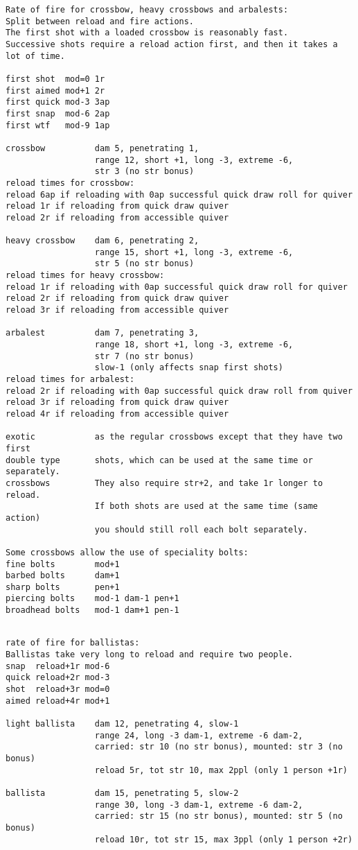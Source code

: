 \begin{verbatim}
\end{verbatim} \pagebreak[1] \begin{verbatim}
Rate of fire for crossbow, heavy crossbows and arbalests:
Split between reload and fire actions.
The first shot with a loaded crossbow is reasonably fast.
Successive shots require a reload action first, and then it takes a lot of time.

first shot  mod=0 1r
first aimed mod+1 2r
first quick mod-3 3ap
first snap  mod-6 2ap
first wtf   mod-9 1ap

crossbow          dam 5, penetrating 1,
                  range 12, short +1, long -3, extreme -6,
                  str 3 (no str bonus)
reload times for crossbow:
reload 6ap if reloading with 0ap successful quick draw roll for quiver
reload 1r if reloading from quick draw quiver
reload 2r if reloading from accessible quiver

heavy crossbow    dam 6, penetrating 2,
                  range 15, short +1, long -3, extreme -6,
                  str 5 (no str bonus)
reload times for heavy crossbow:
reload 1r if reloading with 0ap successful quick draw roll for quiver
reload 2r if reloading from quick draw quiver
reload 3r if reloading from accessible quiver

arbalest          dam 7, penetrating 3,
                  range 18, short +1, long -3, extreme -6,
                  str 7 (no str bonus)
                  slow-1 (only affects snap first shots)
reload times for arbalest:
reload 2r if reloading with 0ap successful quick draw roll from quiver
reload 3r if reloading from quick draw quiver
reload 4r if reloading from accessible quiver

exotic            as the regular crossbows except that they have two first
double type       shots, which can be used at the same time or separately.
crossbows         They also require str+2, and take 1r longer to reload.
                  If both shots are used at the same time (same action)
                  you should still roll each bolt separately.

Some crossbows allow the use of speciality bolts:
fine bolts        mod+1
barbed bolts      dam+1
sharp bolts       pen+1
piercing bolts    mod-1 dam-1 pen+1
broadhead bolts   mod-1 dam+1 pen-1


\end{verbatim} \pagebreak[1] \begin{verbatim}
rate of fire for ballistas:
Ballistas take very long to reload and require two people.
snap  reload+1r mod-6
quick reload+2r mod-3
shot  reload+3r mod=0
aimed reload+4r mod+1

light ballista    dam 12, penetrating 4, slow-1
                  range 24, long -3 dam-1, extreme -6 dam-2,
                  carried: str 10 (no str bonus), mounted: str 3 (no bonus)
                  reload 5r, tot str 10, max 2ppl (only 1 person +1r)

ballista          dam 15, penetrating 5, slow-2
                  range 30, long -3 dam-1, extreme -6 dam-2,
                  carried: str 15 (no str bonus), mounted: str 5 (no bonus)
                  reload 10r, tot str 15, max 3ppl (only 1 person +2r)

\end{verbatim}
